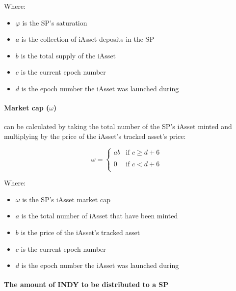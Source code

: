 \documentclass{article}
\begin{document}
\begin{sloppypar}
Where:

\begin{itemize}
\item
  \(\varphi\) is the SP's saturation
\item
  \(a\) is the collection of iAsset deposits in the SP
\item
  \(b\) is the total supply of the iAsset
\item
  \(c\) is the current epoch number
\item
  \(d\) is the epoch number the iAsset was launched during
\end{itemize}

\filbreak

\hypertarget{market-cap-omega}{%
\paragraph{\texorpdfstring{Market cap
(\(\omega\))}{Market cap (\textbackslash omega)}}\label{market-cap-omega}}

can be calculated by taking the total number of the SP's iAsset minted
and multiplying by the price of the iAsset's tracked asset's price:

\[\omega = \left\{ \begin{matrix}
  ab & \text{if\ }c \geq d + 6 \\ \\
  0 & \text{if\ }c < d + 6 \\
  \end{matrix} \right.\ \]

Where:

\begin{itemize}
\item
  \(\omega\) is the SP's iAsset market cap
\item
  \(a\) is the total number of iAsset that have been minted
\item
  \(b\) is the price of the iAsset's tracked asset
\item
  \(c\) is the current epoch number
\item
  \(d\) is the epoch number the iAsset was launched during
\end{itemize}

\filbreak

\hypertarget{the-amount-of-indy-to-be-distributed-to-a-sp}{%
\paragraph{The amount of INDY to be distributed to a
SP}\label{the-amount-of-indy-to-be-distributed-to-a-sp}}


\end{sloppypar}
\end{document}
